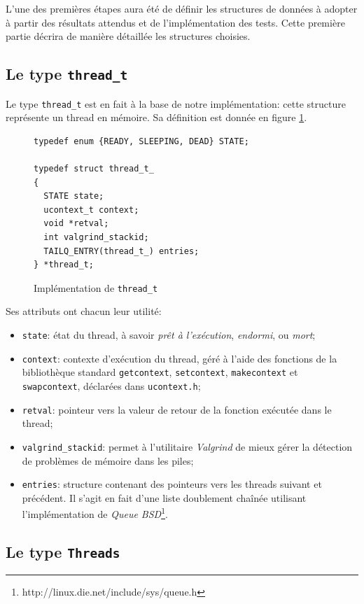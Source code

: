 \documentclass[a4paper,11pt]{article}
\begin{document}
L'une des premières étapes aura été de définir les structures de données à adopter à partir des résultats attendus et de l'implémentation des tests. Cette première partie décrira de manière détaillée les structures choisies.

\subsection{Le type \texttt{thread\_t}}

Le type \texttt{thread\_t} est en fait à la base de notre implémentation: cette structure représente un thread en mémoire. Sa définition est donnée en figure \ref{threadt}.

\begin{figure}[H]
\begin{lstlisting}
typedef enum {READY, SLEEPING, DEAD} STATE;

typedef struct thread_t_
{
  STATE state;
  ucontext_t context;
  void *retval;
  int valgrind_stackid;
  TAILQ_ENTRY(thread_t_) entries;
} *thread_t;
\end{lstlisting}
\caption{Implémentation de \texttt{thread\_t}}
\label{threadt}
\end{figure}

Ses attributs ont chacun leur utilité:
\begin{itemize}
  \item \texttt{state}: état du thread, à savoir \emph{prêt à l'exécution}, \emph{endormi}, ou \emph{mort};
  \item \texttt{context}: contexte d'exécution du thread, géré à l'aide des fonctions de la bibliothèque standard \texttt{getcontext}, \texttt{setcontext}, \texttt{makecontext} et \texttt{swapcontext}, déclarées dans \texttt{ucontext.h};
  \item \texttt{retval}: pointeur vers la valeur de retour de la fonction exécutée dans le thread;
  \item \texttt{valgrind\_stackid}: permet à l'utilitaire \textit{Valgrind} de mieux gérer la détection de problèmes de mémoire dans les piles;
  \item \texttt{entries}: structure contenant des pointeurs vers les threads suivant et précédent. Il s'agit en fait d'une liste doublement chaînée utilisant l'implémentation de \textit{Queue BSD}\footnote{http://linux.die.net/include/sys/queue.h}.
\end{itemize}

\subsection{Le type \texttt{Threads}}
\end{document}

